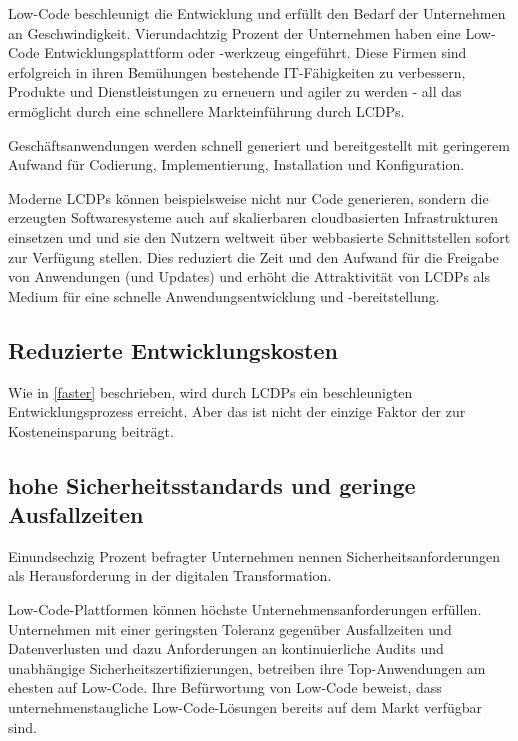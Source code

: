 \documentclass[12pt]{article} %
\begin{document}
	Low-Code beschleunigt die Entwicklung und erfüllt den Bedarf der Unternehmen an Geschwindigkeit. Vierundachtzig Prozent der Unternehmen haben eine Low-Code Entwicklungsplattform oder -werkzeug eingeführt. %
	Diese Firmen sind erfolgreich in ihren Bemühungen bestehende IT-Fähigkeiten zu verbessern, Produkte und Dienstleistungen zu erneuern und agiler zu werden - all das ermöglicht durch eine schnellere Markteinführung durch LCDPs. \cite{EmmaVanPelt.2019}
	
	Geschäftsanwendungen werden schnell generiert und bereitgestellt mit geringerem Aufwand für Codierung, Implementierung, Installation und Konfiguration. \cite{Kaiser.2021}
	
	Moderne LCDPs können beispielsweise nicht nur Code generieren, sondern die erzeugten Softwaresysteme auch auf skalierbaren cloudbasierten Infrastrukturen einsetzen und und sie den Nutzern weltweit über webbasierte Schnittstellen sofort zur Verfügung stellen. Dies reduziert die Zeit und den Aufwand für die Freigabe von Anwendungen (und Updates) und erhöht die Attraktivität von LCDPs als Medium für eine schnelle Anwendungsentwicklung und -bereitstellung. \cite{DiRuscio.2022}
	
	\subsection{Reduzierte Entwicklungskosten}
	Wie in \ref{faster} beschrieben, wird durch LCDPs ein beschleunigten Entwicklungsprozess erreicht. Aber das ist nicht der einzige Faktor der zur Kosteneinsparung beiträgt.   
	
	\subsection{hohe Sicherheitsstandards und geringe Ausfallzeiten} 
	Einundsechzig Prozent befragter Unternehmen nennen Sicherheitsanforderungen als Herausforderung in der digitalen Transformation. \cite{EmmaVanPelt.2019} %
	
	Low-Code-Plattformen können höchste Unternehmensanforderungen erfüllen. Unternehmen mit einer geringsten Toleranz gegenüber Ausfallzeiten und Datenverlusten und dazu Anforderungen an kontinuierliche Audits und unabhängige Sicherheitszertifizierungen, betreiben ihre Top-Anwendungen am ehesten auf Low-Code. Ihre Befürwortung von Low-Code beweist, dass unternehmenstaugliche Low-Code-Lösungen bereits auf dem Markt verfügbar sind. \cite{EmmaVanPelt.2019}
	
\end{document}
